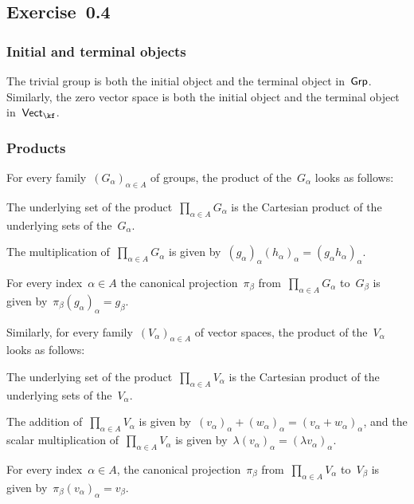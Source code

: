 \subsection{Exercise~0.4}



\subsubsection{Initial and terminal objects}

The trivial group is both the initial object and the terminal object in~$\mathsf{Grp}$.
Similarly, the zero vector space is both the initial object and the terminal object in~$\Vectk$.



\subsubsection{Products}

For every family~$(G_α)_{α ∈ A}$ of groups, the product of the~$G_α$ looks as follows:
\begin{itemize*}

	\item
		The underlying set of the product~$\prod_{α ∈ A} G_α$ is the Cartesian product of the underlying sets of the~$G_α$.

	\item
		The multiplication of~$∏_{α ∈ A} G_α$ is given by~$(g_α)_α (h_α)_α = (g_α h_α)_α$.

	\item
		For every index~$α ∈ A$ the canonical projection~$π_β$ from~$∏_{α ∈ A} G_α$ to~$G_β$ is given by~$π_β (g_α)_α  = g_β$.

\end{itemize*}
Similarly, for every family~$(V_α)_{α ∈ A}$ of vector spaces, the product of the~$V_α$ looks as follows:
\begin{itemize*}

	\item
		The underlying set of the product~$\prod_{α ∈ A} V_α$ is the Cartesian product of the underlying sets of the~$V_α$.

	\item
		The addition of~$∏_{α ∈ A} V_α$ is given by~$(v_α)_α + (w_α)_α =(v_α + w_α)_α$, and the scalar multiplication of~$∏_{α ∈ A} V_α$ is given by~$λ (v_α)_α = (λ v_α)_α$.

	\item
		For every index~$α ∈ A$, the canonical projection~$π_β$ from~$∏_{α ∈ A} V_α$ to~$V_β$ is given by~$π_β (v_α)_α  = v_β$.

\end{itemize*}



